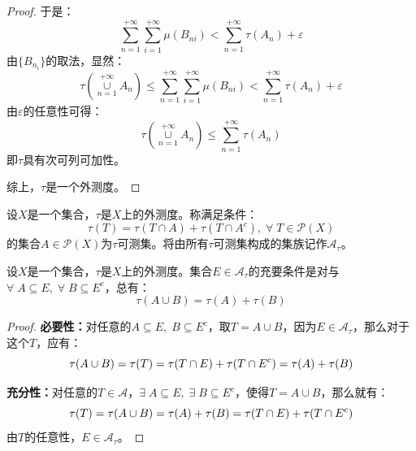 \begin{proof}
	于是：
	\begin{equation*}
		\sum_{n=1}^{+\infty}\sum_{i=1}^{+\infty}\mu(B_{ni})<\sum_{n=1}^{+\infty}\tau(A_n)+\varepsilon
	\end{equation*}
	由$\{B_{n_i}\}$的取法，显然：
	\begin{equation*}
		\tau\left(\underset{n=1}{\overset{+\infty}{\cup}}A_n\right)\leqslant\sum_{n=1}^{+\infty}\sum_{i=1}^{+\infty}\mu(B_{ni})<\sum_{n=1}^{+\infty}\tau(A_n)+\varepsilon
	\end{equation*}
	由$\varepsilon$的任意性可得：
	\begin{equation*}
		\tau\left(\underset{n=1}{\overset{+\infty}{\cup}}A_n\right)\leqslant\sum_{n=1}^{+\infty}\tau(A_n)
	\end{equation*}
	即$\tau$具有次可列可加性。\par
	综上，$\tau$是一个外测度。
\end{proof}
\begin{definition}
	设$X$是一个集合，$\tau$是$X$上的外测度。称满足条件：
	\begin{equation*}
		\tau(T)=\tau(T\cap A)+\tau(T\cap A^c),\;\forall\;T\in\mathscr{P}(X)
	\end{equation*}
	的集合$A\in\mathscr{P}(X)$为$\tau$可测集。将由所有$\tau$可测集构成的集族记作$\mathscr{A}_{\tau}$。
\end{definition}
\begin{lemma}\label{lem:EmeasureAB}
	设$X$是一个集合，$\tau$是$X$上的外测度。集合$E\in\mathscr{A}_{\tau}$的充要条件是对与$\forall\;A\subseteq E,\;\forall\;B\subseteq E^c$，总有：
	\begin{equation*}
		\tau(A\cup B)=\tau(A)+\tau(B)
	\end{equation*}
\end{lemma}
\begin{proof}
	\textbf{必要性：}对任意的$A\subseteq E,\;B\subseteq E^c$，取$T=A\cup B$，因为$E\in\mathscr{A}_{\tau}$，那么对于这个$T$，应有：
	\begin{equation}
		\tau(A\cup B)=\tau(T)=\tau(T\cap E)+\tau(T\cap E^c)=\tau(A)+\tau(B)\notag
	\end{equation}\par
	\textbf{充分性：}对任意的$T\in\mathscr{A}$，$\exists\;A\subseteq E,\;\exists\; B\subseteq E^c$，使得$T=A\cup B$，那么就有：
	\begin{equation}
		\tau(T)=\tau(A\cup B)=\tau(A)+\tau(B)=\tau(T\cap E)+\tau(T\cap E^c)\notag
	\end{equation}
	由$T$的任意性，$E\in\mathscr{A}_{\tau}$。
\end{proof}
